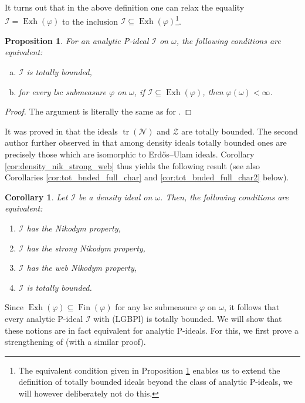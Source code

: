 \documentclass[a4paper,11pt,fleqn]{amsart}
\newtheorem{proposition}[theorem]{Proposition}
\newtheorem{corollary}[theorem]{Corollary}
\theoremstyle{definition}
\theoremstyle{remark}
\numberwithin{equation}{section}
\newcommand{\aA}{\mathcal{A}}
\newcommand{\iI}{\mathcal{I}}
\newcommand{\nN}{\mathcal{N}}
\newcommand{\zZ}{\mathcal{Z}}
\DeclareMathOperator{\exh}{Exh}
\DeclareMathOperator{\fin}{Fin}
\newcommand{\sub}{\subseteq}
\newcommand{\erdos}{{Erd\H{o}s}}
\DeclareMathOperator{\tr}{tr}
\begin{document}
It turns out that in the above definition one can relax the equality $\iI=\exh(\varphi)$ to the inclusion $\iI\sub\exh(\varphi)$\footnote{The equivalent condition given in Proposition \ref{prop:tot_bnded_equiv_def} enables us to extend the definition of totally bounded ideals beyond the class of analytic P-ideals, we will however deliberately not do this.}.

\begin{proposition}\label{prop:tot_bnded_equiv_def}
    For an analytic P-ideal $\iI$ on $\omega$, the following conditions are equivalent:
    \begin{enumerate}[(a)]
        \item $\iI$ is totally bounded,
        \item for every lsc submeasure $\varphi$ on $\omega$, if $\iI\sub\exh(\varphi)$, then $\varphi(\omega)<\infty$.
    \end{enumerate}
\end{proposition}
\begin{proof}
    The argument is literally the same as for \cite[Corollary 4.6]{Zuc25}.
\end{proof}

It was proved in \cite[Proposition 3.18]{HHH07} that the ideals $\tr(\nN)$ and $\zZ$ are totally bounded. The second author further observed in \cite[Theorem 5.5]{Zuc25} that among density ideals totally bounded ones are precisely those which are isomorphic to \erdos--Ulam ideals. Corollary \ref{cor:density_nik_strong_web} thus yields the following result (see also Corollaries \ref{cor:tot_bnded_full_char} and \ref{cor:tot_bnded_full_char2} below).

\begin{corollary}\label{cor:density_nik_strong_web_totally bounded}
    Let $\iI$ be a density ideal on $\omega$. Then, the following conditions are equivalent:
    \begin{enumerate}
        \item $\iI$ has the Nikodym property,
        \item $\iI$ has the strong Nikodym property,
        \item $\iI$ has the web Nikodym property,
        \item $\iI$ is totally bounded.
    \end{enumerate}    
\end{corollary}

Since $\exh(\varphi)\sub\fin(\varphi)$ for any lsc submeasure $\varphi$ on $\omega$, it follows that every analytic P-ideal $\iI$ with (LGBPl) is totally bounded. We will show that these notions are in fact equivalent for analytic P-ideals. For this, we first prove a strengthening of \cite[Lemma 2.6]{Sak18} (with a similar proof).
\end{document}
